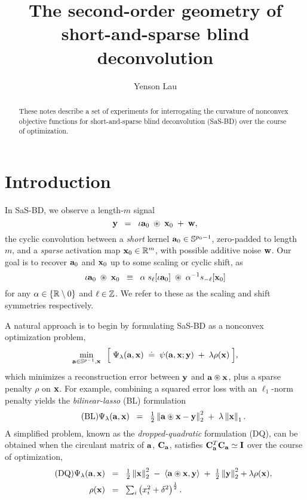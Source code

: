 \documentclass{article}
\title{The second-order geometry of \\ short-and-sparse blind deconvolution}
\author{Yenson Lau}
\numberwithin{equation}{section}
\begin{document}
\maketitle

\begin{abstract}
  These notes describe a set of experiments for interrogating the curvature of nonconvex objective functions for short-and-sparse blind deconvolution (SaS-BD) over the course of optimization.
\end{abstract}

\section{Introduction}
In SaS-BD, we observe a length-$m$ signal
\begin{equation*}
  \mathbf{y} \;\;=\;\; \iota\mathbf{a}_0 \;\circledast\; \mathbf{x}_0 \;+\; \mathbf{w},
\end{equation*}
the cyclic convolution between a {\em short} kernel $\mathbf{a}_0\in\mathbb{S}^{p_0-1}$, zero-padded to length $m$, and a {\em sparse} activation map $\mathbf{x}_0\in\mathbb{R}^m$, with possible additive noise $\mathbf{w}$. Our goal is to recover $\mathbf{a}_0$ and $\mathbf{x}_0$ up to some scaling or cyclic shift, as
\begin{equation*}
  \iota\mathbf{a}_0 \;\circledast\; \mathbf{x}_0 \;\;\equiv\;\;
  \alpha\;s_\ell[\iota\mathbf{a}_0] \;\circledast\; \alpha^{-1} s_{-\ell}[\mathbf{x}_0]
\end{equation*}
for any $\alpha\in\left\{ \mathbb{R}\setminus0\right\}$ and $\ell\in\mathbb{Z}$. We refer to these as the scaling and shift symmetries respectively.

A natural approach is to begin by formulating SaS-BD as a nonconvex optimization problem,
\begin{equation} \label{eqn:obj-Psi}
  \min_{\mathbf{a} \in \mathbb{S}^{p-1}, \mathbf{x}} \;\;\Big[\;
    \Psi_\lambda(\mathbf{a}, \mathbf{x}) \;\doteq\; \psi(\mathbf{a}, \mathbf{x} ; \mathbf{y})
    \;+\; \lambda\rho(\mathbf{x})
  \;\Big],
\end{equation}
which minimizes a reconstruction error between $\mathbf{y}$ and $\mathbf{a}\circledast\mathbf{x}$, plus a sparse penalty $\rho$ on $\mathbf{x}$. For example, combining a squared error loss with an $\ell_1$-norm penalty yields the {\em bilinear-lasso} (BL) formulation
\begin{equation} \tag{BL} \label{eqn:bl}
  \Psi_\lambda(\mathbf{a},\mathbf{x}) \;\;=\;\; \tfrac12\left\lVert \mathbf{a}\circledast\mathbf{x}-\mathbf{y}\right\rVert_2^2 \;+\; \lambda\left\lVert \mathbf{x}\right\rVert_1.
\end{equation}
A simplified problem, known as the {\em dropped-quadratic} formulation (DQ), can be obtained when the circulant matrix of $\mathbf{a}$, $\mathbf{C}_{\mathbf{a}}$, satisfies $\mathbf{C}_{\mathbf{a}}^T\mathbf{C}_{\mathbf{a}} \simeq \mathbf{I}$ over the course of optimization,
\begin{align} \tag{DQ} \label{eqn:dq}
  \Psi_\lambda(\mathbf{a},\mathbf{x}) \;\;&=\;\; \tfrac12\left\lVert \mathbf{x}\right\rVert_2^2 \;-\; \left\langle \mathbf{a}\circledast \mathbf{x}, \mathbf{y}\right\rangle \;+\; \tfrac12\left\lVert \mathbf{y}\right\rVert_2^2+\lambda\rho(\mathbf{x}), \\
  \rho(\mathbf{x}) \;\;&=\;\; \textstyle \sum_i \left( x_i^2+\delta^2\right)^{\frac12}.
\end{align}
\end{document}
